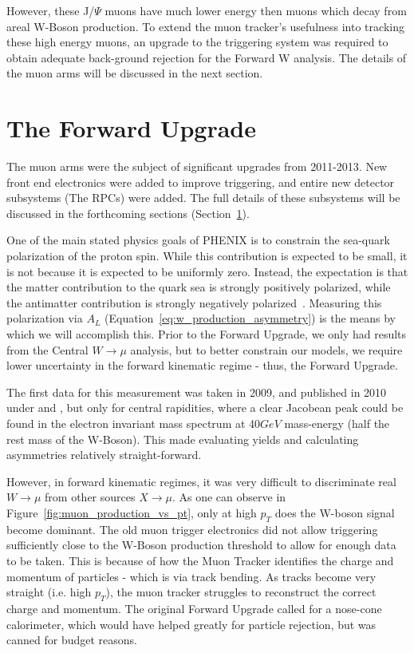 However, these J/$\Psi$ muons have much lower energy then muons which decay from
areal W-Boson production. To extend the muon tracker's usefulness into tracking
these high energy muons, an upgrade to the triggering system was required to
obtain adequate back-ground rejection for the Forward W analysis. The details of
the muon arms will be discussed in the next section.

\clearpage
\section{The Forward Upgrade} 
\label{sec:forward_upgrade}

The muon arms were the subject of significant upgrades from 2011-2013.
New front end electronics were added to improve triggering, and entire new
detector subsystems (The RPCs) were added. The full details of these subsystems
will be discussed in the forthcoming sections (Section~\ref{sec:forward_upgrade}).

One of the main stated physics goals of PHENIX is to constrain the sea-quark
polarization of the proton spin. While this contribution is
expected to be small, it is not because it is expected to be uniformly zero.
Instead, the expectation is that the matter contribution to the quark sea is
strongly positively polarized, while the antimatter contribution is strongly
negatively polarized~\cite{Aidala2005}. Measuring this polarization via $A_L$
(Equation~\ref{eq:w_production_asymmetry}) is the means by which we will
accomplish this. Prior to the Forward Upgrade, we only had results from the
Central $W\rightarrow\mu$ analysis, but to better constrain our models, we
require lower uncertainty in the forward kinematic regime - thus, the Forward
Upgrade.

The first data for this measurement was taken in 2009, and published in 2010
under \cite{Adare2010} and \cite{Okada2010}, but only for central rapidities,
where a clear Jacobean peak could be found in the electron invariant mass
spectrum at 40$GeV$ mass-energy (half the rest mass of the W-Boson). This made
evaluating yields and calculating asymmetries relatively straight-forward. 

However, in forward kinematic regimes, it was very difficult to discriminate
real $W\rightarrow\mu$ from other sources $X\rightarrow\mu$. As one can observe
in Figure~\ref{fig:muon_production_vs_pt}, only at high $p_T$ does the W-boson
signal become dominant. The old muon trigger electronics did not allow
triggering sufficiently close to the W-Boson production threshold to allow for
enough data to be taken. This is because of how the Muon Tracker identifies the
charge and momentum of particles - which is via track bending. As tracks become
very straight (i.e. high $p_T$), the muon tracker struggles to reconstruct the
correct charge and momentum. The original Forward Upgrade called for a nose-cone
calorimeter, which would have helped greatly for particle rejection, but was
canned for budget reasons.


